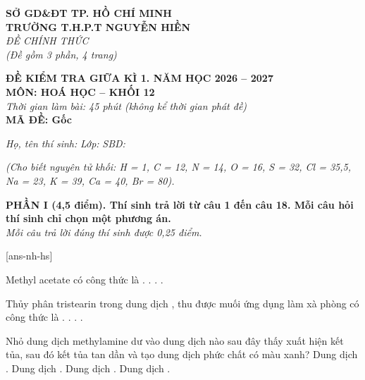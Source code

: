 \documentclass[11pt,a4paper]{article}
\begin{document}
\begin{minipage}[t]{0.45\textwidth}
\textbf{SỞ GD\&ĐT TP. HỒ CHÍ MINH}\\
\textbf{TRƯỜNG T.H.P.T NGUYỄN HIỀN}\\
\textit{ĐỀ CHÍNH THỨC}\\
\textit{(Đề gồm 3 phần, 4 trang)}
\end{minipage}
\hfill
\begin{minipage}[t]{0.52\textwidth}
\raggedleft
\textbf{\color{hfRed}ĐỀ KIỂM TRA GIỮA KÌ 1. NĂM HỌC 2026 -- 2027}\\
\textbf{MÔN: HOÁ HỌC -- KHỐI 12}\\
\textit{Thời gian làm bài: 45 phút (không kể thời gian phát đề)}\\
\textbf{MÃ ĐỀ: Gốc}
\end{minipage}

\vspace{3pt}
\noindent
\textit{Họ, tên thí sinh:} \dotfill \textit{Lớp:} \dotfill \textit{SBD:} \dotfill

\vspace{2pt}
\noindent
\textit{\footnotesize (Cho biết nguyên tử khối: H = 1, C = 12, N = 14, O = 16, S = 32, Cl = 35,5, Na = 23, K = 39, Ca = 40, Br = 80).}

\vspace{2pt}
\noindent
\textbf{\color{mainGreen}PHẦN I (4,5 điểm). Thí sinh trả lời từ câu 1 đến câu 18. Mỗi câu hỏi thí sinh chỉ chọn một phương án.}\\
\textit{Mỗi câu trả lời đúng thí sinh được 0,25 điểm.}

[ans-nh-hs]

\begin{ex}
Methyl acetate có công thức là
\choice
{.}
{\True {}.}
{.}
{.}

\end{ex}

\begin{ex}
Thủy phân tristearin  trong dung dịch , thu được muối ứng dụng làm xà phòng có công thức là
\choice
{.}
{\True {}.}
{.}
{.}

\end{ex}

\begin{ex}
Nhỏ dung dịch methylamine dư vào dung dịch nào sau đây thấy xuất hiện kết tủa, sau đó kết tủa tan dần và tạo dung dịch phức chất có màu xanh?
\choice
{Dung dịch .}
{Dung dịch .}
{\True Dung dịch .}
{Dung dịch .}

\end{ex}
\end{document}
